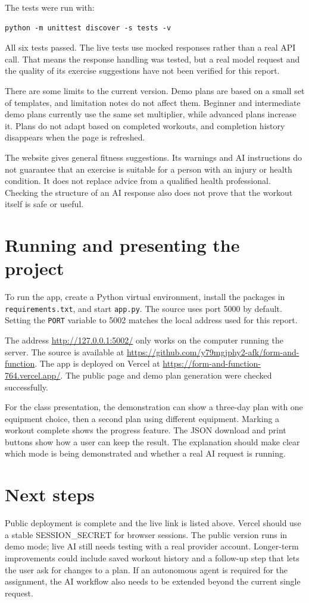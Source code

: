 \documentclass[11pt,letterpaper]{article}
\begin{document}
The tests were run with:
\begin{verbatim}
python -m unittest discover -s tests -v
\end{verbatim}
All six tests passed. The live tests use mocked responses rather than a real API call. That means the response handling was tested, but a real model request and the quality of its exercise suggestions have not been verified for this report.

There are some limits to the current version. Demo plans are based on a small set of templates, and limitation notes do not affect them. Beginner and intermediate demo plans currently use the same set multiplier, while advanced plans increase it. Plans do not adapt based on completed workouts, and completion history disappears when the page is refreshed.

The website gives general fitness suggestions. Its warnings and AI instructions do not guarantee that an exercise is suitable for a person with an injury or health condition. It does not replace advice from a qualified health professional. Checking the structure of an AI response also does not prove that the workout itself is safe or useful.

\section*{Running and presenting the project}
To run the app, create a Python virtual environment, install the packages in \texttt{requirements.txt}, and start \texttt{app.py}. The source uses port 5000 by default. Setting the \texttt{PORT} variable to 5002 matches the local address used for this report.

The address \url{http://127.0.0.1:5002/} only works on the computer running the server. The source is available at \url{https://github.com/y79mgjphy2-afk/form-and-function}. The app is deployed on Vercel at \url{https://form-and-function-764.vercel.app/}. The public page and demo plan generation were checked successfully.

For the class presentation, the demonstration can show a three-day plan with one equipment choice, then a second plan using different equipment. Marking a workout complete shows the progress feature. The JSON download and print buttons show how a user can keep the result. The explanation should make clear which mode is being demonstrated and whether a real AI request is running.

\section*{Next steps}
Public deployment is complete and the live link is listed above. Vercel should use a stable SESSION\_SECRET for browser sessions. The public version runs in demo mode; live AI still needs testing with a real provider account. Longer-term improvements could include saved workout history and a follow-up step that lets the user ask for changes to a plan. If an autonomous agent is required for the assignment, the AI workflow also needs to be extended beyond the current single request.
\end{document}
